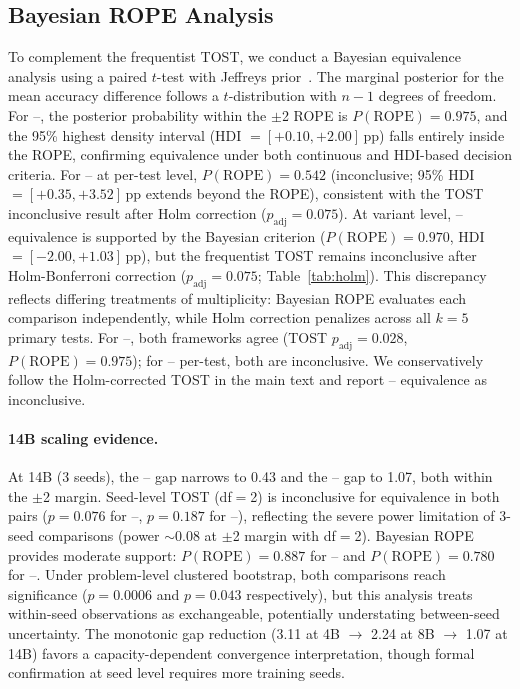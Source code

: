 \subsection{Bayesian ROPE Analysis}
\label{app:bayesian_rope}
To complement the frequentist TOST, we conduct a Bayesian equivalence analysis using a paired $t$-test with Jeffreys prior~\cite{kruschke2013bayesian,kruschke2018rejecting}. The marginal posterior for the mean accuracy difference follows a $t$-distribution with $n{-}1$ degrees of freedom. For \cls{}--\cwm{}, the posterior probability within the $\pm$2\pp{} ROPE is $P(\text{ROPE}) = 0.975$, and the 95\% highest density interval (HDI $= [{+}0.10, {+}2.00]$\,pp) falls entirely inside the ROPE, confirming equivalence under both continuous and HDI-based decision criteria. For \cls{}--\traj{} at per-test level, $P(\text{ROPE}) = 0.542$ (inconclusive; 95\% HDI $= [{+}0.35, {+}3.52]$\,pp extends beyond the ROPE), consistent with the TOST inconclusive result after Holm correction ($p_{\text{adj}} = 0.075$). At variant level, \cls{}--\traj{} equivalence is supported by the Bayesian criterion ($P(\text{ROPE}) = 0.970$, HDI $= [{-}2.00, {+}1.03]$\,pp), but the frequentist TOST remains inconclusive after Holm-Bonferroni correction ($p_{\text{adj}} = 0.075$; Table~\ref{tab:holm}). This discrepancy reflects differing treatments of multiplicity: Bayesian ROPE evaluates each comparison independently, while Holm correction penalizes across all $k{=}5$ primary tests. For \cls{}--\cwm{}, both frameworks agree (TOST $p_{\text{adj}}{=}0.028$, $P(\text{ROPE}){=}0.975$); for \cls{}--\traj{} per-test, both are inconclusive. We conservatively follow the Holm-corrected TOST in the main text and report \cls{}--\traj{} equivalence as inconclusive.

\paragraph{14B scaling evidence.} At 14B (3 seeds), the \cls{}--\cwm{} gap narrows to 0.43\pp{} and the \cls{}--\traj{} gap to 1.07\pp{}, both within the $\pm$2\pp{} margin. Seed-level TOST (df${=}$2) is inconclusive for equivalence in both pairs ($p{=}0.076$ for \cls{}--\cwm{}, $p{=}0.187$ for \cls{}--\traj{}), reflecting the severe power limitation of 3-seed comparisons (power ${\sim}$0.08 at $\pm$2\pp{} margin with df${=}$2). Bayesian ROPE provides moderate support: $P(\text{ROPE}){=}0.887$ for \cls{}--\cwm{} and $P(\text{ROPE}){=}0.780$ for \cls{}--\traj{}. Under problem-level clustered bootstrap, both comparisons reach significance ($p{=}0.0006$ and $p{=}0.043$ respectively), but this analysis treats within-seed observations as exchangeable, potentially understating between-seed uncertainty. The monotonic gap reduction (3.11\pp{} at 4B $\to$ 2.24\pp{} at 8B $\to$ 1.07\pp{} at 14B) favors a capacity-dependent convergence interpretation, though formal confirmation at seed level requires more training seeds.


